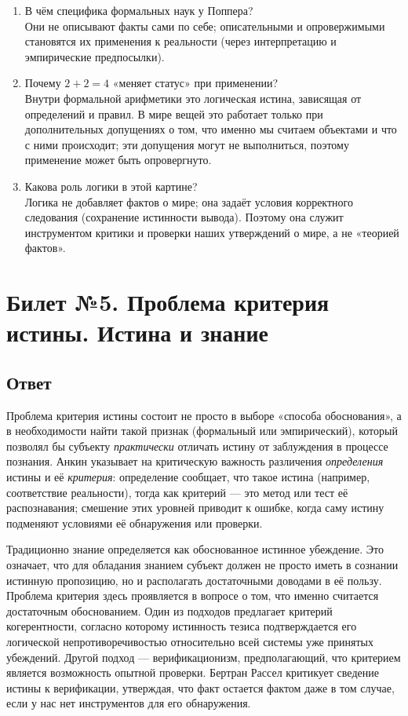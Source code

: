 \documentclass[a4paper,12pt]{article}
\begin{document}
\begin{enumerate}
    \item В чём специфика формальных наук у Поппера?\\
    Они не описывают факты сами по себе; описательными и опровержимыми становятся их применения к реальности (через интерпретацию и эмпирические предпосылки).

    \item Почему $2+2=4$ «меняет статус» при применении?\\
    Внутри формальной арифметики это логическая истина, зависящая от определений и правил. В мире вещей это работает только при дополнительных допущениях о том, что именно мы считаем объектами и что с ними происходит; эти допущения могут не выполниться, поэтому применение может быть опровергнуто.

    \item Какова роль логики в этой картине?\\
    Логика не добавляет фактов о мире; она задаёт условия корректного следования (сохранение истинности вывода). Поэтому она служит инструментом критики и проверки наших утверждений о мире, а не «теорией фактов».
\end{enumerate}


\newpage
\section{Билет №5. Проблема критерия истины. Истина и знание}

\subsection{Ответ}
Проблема критерия истины состоит не просто в выборе «способа обоснования», а в необходимости найти такой признак (формальный или эмпирический), который позволял бы субъекту \emph{практически} отличать истину от заблуждения в процессе познания. Анкин указывает на критическую важность различения \emph{определения} истины и её \emph{критерия}: определение сообщает, что такое истина (например, соответствие реальности), тогда как критерий — это метод или тест её распознавания; смешение этих уровней приводит к ошибке, когда саму истину подменяют условиями её обнаружения или проверки.

Традиционно знание определяется как обоснованное истинное убеждение. Это означает, что для обладания знанием субъект должен не просто иметь в сознании истинную пропозицию, но и располагать достаточными доводами в её пользу. Проблема критерия здесь проявляется в вопросе о том, что именно считается достаточным обоснованием. Один из подходов предлагает критерий когерентности, согласно которому истинность тезиса подтверждается его логической непротиворечивостью относительно всей системы уже принятых убеждений. Другой подход — верификационизм, предполагающий, что критерием является возможность опытной проверки. Бертран Рассел критикует сведение истины к верификации, утверждая, что факт остается фактом даже в том случае, если у нас нет инструментов для его обнаружения.
\end{document}
